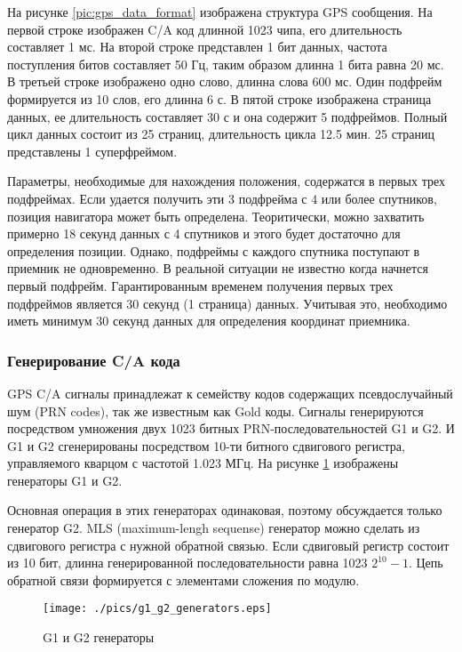 На рисунке \ref{pic:gps_data_format} изображена структура GPS сообщения. На первой строке изображен C/A код
длинной 1023 чипа, его длительность составляет 1 мс. На второй строке представлен 1 бит данных, частота поступления
битов составляет 50 Гц, таким образом длинна 1 бита равна 20 мс. В третьей строке изображено одно слово, длинна слова
600 мс. Один подфрейм формируется из 10 слов, его длинна 6 с. В пятой строке изображена страница данных, ее длительность
составляет 30 с и она содержит 5 подфреймов. Полный цикл данных состоит из 25 страниц, длительность цикла 12.5 мин.
25 страниц представлены 1 суперфреймом.

Параметры, необходимые для нахождения положения, содержатся в первых трех подфреймах. Если удается получить эти 3
подфрейма с 4 или более спутников, позиция навигатора может быть определена.  Теоритически, можно захватить примерно
18 секунд данных с 4 спутников и этого будет достаточно для определения позиции. Однако, подфреймы с каждого спутника
поступают в приемник не одновременно. В реальной ситуации не известно когда начнется первый подфрейм. Гарантированным
временем получения первых трех подфреймов является 30 секунд (1 страница) данных. Учитывая это, необходимо иметь
минимум 30 секунд данных для определения координат приемника.

\subsubsection{Генерирование C/A кода}
GPS C/A сигналы принадлежат к семейству кодов содержащих псевдослучайный шум (PRN codes), так же известным как Gold коды.
Сигналы генерируются посредством умножения двух 1023 битных PRN-последовательностей G1 и G2. И G1 и G2 сгенерированы
посредством 10-ти битного сдвигового регистра, управляемого кварцом с частотой 1.023 МГц. На рисунке
\ref{pic:g1_g2_generators} изображены генераторы G1 и G2.

Основная операция в этих генераторах одинаковая, поэтому обсуждается только генератор G2. MLS (maximum-lengh sequense)
генератор можно сделать из сдвигового регистра с нужной обратной связью. Если сдвиговый регистр состоит из 10 бит,
длинна генерированной последовательности равна 1023 ${2^{10}-1}$. Цепь обратной связи формируется с элементами сложения
по модулю.

\begin{figure}
\begin{center}
\texttt{[image: ./pics/g1\_g2\_generators.eps]}
\end{center}
\caption{G1 и G2 генераторы}
\label{pic:g1_g2_generators}
\end{figure}

